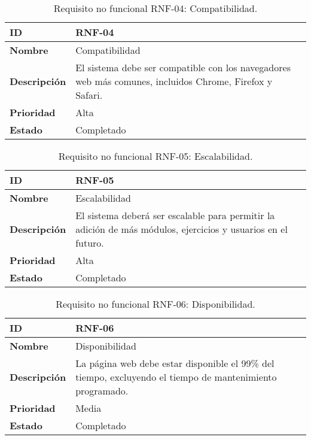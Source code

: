\begin{table}[H]
    \centering
    \begin{tabular}{|l|p{9.5cm}|}
        \hline
        \textbf{ID} & RNF-04 \\
        \hline
        \textbf{Nombre} & Compatibilidad \\
        \hline
        \textbf{Descripción} & El sistema debe ser compatible con los navegadores web más comunes, incluidos Chrome, Firefox y Safari. \\
        \hline
        \textbf{Prioridad} & Alta \\
        \hline
        \textbf{Estado} & Completado \\
        \hline
    \end{tabular}
    \caption{Requisito no funcional RNF-04: Compatibilidad.}
    \label{table:req-RNF35}
\end{table}

\begin{table}[H]
    \centering
    \begin{tabular}{|l|p{9.5cm}|}
        \hline
        \textbf{ID} & RNF-05 \\
        \hline
        \textbf{Nombre} & Escalabilidad \\
        \hline
        \textbf{Descripción} & El sistema deberá ser escalable para permitir la adición de más módulos, ejercicios y usuarios en el futuro. \\
        \hline
        \textbf{Prioridad} & Alta \\
        \hline
        \textbf{Estado} & Completado \\
        \hline
    \end{tabular}
    \caption{Requisito no funcional RNF-05: Escalabilidad.}
    \label{table:req-RNF36}
\end{table}

\begin{table}[H]
    \centering
    \begin{tabular}{|l|p{9.5cm}|}
        \hline
        \textbf{ID} & RNF-06 \\
        \hline
        \textbf{Nombre} & Disponibilidad \\
        \hline
        \textbf{Descripción} & La página web debe estar disponible el 99\% del tiempo, excluyendo el tiempo de mantenimiento programado. \\
        \hline
        \textbf{Prioridad} & Media \\
        \hline
        \textbf{Estado} & Completado \\
        \hline
    \end{tabular}
    \caption{Requisito no funcional RNF-06: Disponibilidad.}
    \label{table:req-RNF37}
\end{table}

